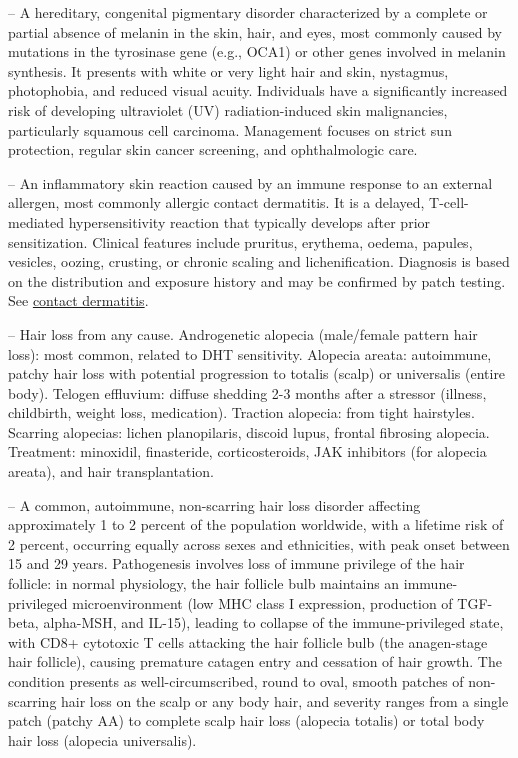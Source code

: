 -- A hereditary, congenital pigmentary disorder characterized by a complete or partial absence of melanin in the skin, hair, and eyes, most commonly caused by mutations in the tyrosinase gene (e.g., OCA1) or other genes involved in melanin synthesis. It presents with white or very light hair and skin, nystagmus, photophobia, and reduced visual acuity. Individuals have a significantly increased risk of developing ultraviolet (UV) radiation-induced skin malignancies, particularly squamous cell carcinoma. Management focuses on strict sun protection, regular skin cancer screening, and ophthalmologic care.

-- An inflammatory skin reaction caused by an immune response to an external allergen, most commonly allergic contact dermatitis. It is a delayed, T-cell-mediated hypersensitivity reaction that typically develops after prior sensitization. Clinical features include pruritus, erythema, oedema, papules, vesicles, oozing, crusting, or chronic scaling and lichenification. Diagnosis is based on the distribution and exposure history and may be confirmed by patch testing. See \hyperlink{Contact Dermatitis}{contact dermatitis}.

-- Hair loss from any cause. Androgenetic alopecia (male/female pattern hair loss): most common, related to DHT sensitivity. Alopecia areata: autoimmune, patchy hair loss with potential progression to totalis (scalp) or universalis (entire body). Telogen effluvium: diffuse shedding 2-3 months after a stressor (illness, childbirth, weight loss, medication). Traction alopecia: from tight hairstyles. Scarring alopecias: lichen planopilaris, discoid lupus, frontal fibrosing alopecia. Treatment: minoxidil, finasteride, corticosteroids, JAK inhibitors (for alopecia areata), and hair transplantation.

-- A common, autoimmune, non-scarring hair loss disorder affecting approximately 1 to 2 percent of the population worldwide, with a lifetime risk of 2 percent, occurring equally across sexes and ethnicities, with peak onset between 15 and 29 years. Pathogenesis involves loss of immune privilege of the hair follicle: in normal physiology, the hair follicle bulb maintains an immune-privileged microenvironment (low MHC class I expression, production of TGF-beta, alpha-MSH, and IL-15), leading to collapse of the immune-privileged state, with CD8+ cytotoxic T cells attacking the hair follicle bulb (the anagen-stage hair follicle), causing premature catagen entry and cessation of hair growth. The condition presents as well-circumscribed, round to oval, smooth patches of non-scarring hair loss on the scalp or any body hair, and severity ranges from a single patch (patchy AA) to complete scalp hair loss (alopecia totalis) or total body hair loss (alopecia universalis).

